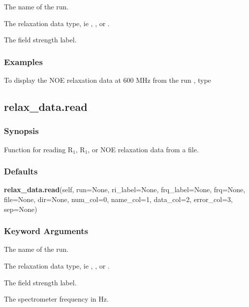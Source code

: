   The name of the run. 

  The relaxation data type, ie , , or . 

  The field strength label. 




\subsubsection{Examples}

To display the NOE relaxation data at 600 MHz from the run , type





\newpage

\subsection{relax\_data.read}


\subsubsection{Synopsis}

Function for reading R$_1$, R$_1$, or NOE relaxation data from a file.



\subsubsection{Defaults}

\textsf{\textbf{relax\_data.read}(self, run=None, ri\_label=None, frq\_label=None, frq=None, file=None, dir=None, num\_col=0, name\_col=1, data\_col=2, error\_col=3, sep=None)}


\subsubsection{Keyword Arguments}

  The name of the run. 

  The relaxation data type, ie , , or . 

  The field strength label. 

  The spectrometer frequency in Hz. 

